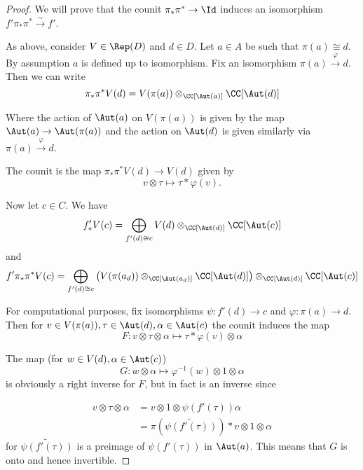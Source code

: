 \begin{proof}
We will prove that the counit $\pi_*\pi^*\rightarrow \Id$ induces an isomorphism $f'\pi_*\pi^*\xrightarrow{\sim}f'$.

As above, consider $V\in\Rep(D)$ and $d\in D$. Let $a\in A$ be such that $\pi(a)\cong d$. By assumption $a$ is defined up to isomorphism. Fix an isomorphism $\pi(a)\xrightarrow{\varphi} d$. Then we can write \[
\pi_*\pi^*V(d)=V(\pi(a))\otimes_{\CC[\Aut(a)]}\CC[\Aut(d)]
\]

Where the action of $\Aut(a)$ on $V(\pi(a))$ is given by the map $\Aut(a)\rightarrow \Aut(\pi(a))$ and the action on $\Aut(d)$ is given similarly via $\pi(a)\xrightarrow{\varphi} d$.

The counit is the map $\pi_*\pi^*V(d)\rightarrow V(d)$ given by \[
v\otimes \tau \mapsto \tau*\varphi(v).
\]

Now let $c\in C$. We have \[
f'_*V(c)=\bigoplus_{f'(d)\cong c} V(d) \otimes_{\CC[\Aut(d)]}\CC[\Aut(c)]
\]
and \[
f'\pi_*\pi^*V(c)=\bigoplus_{f'(d)\cong c} \left(V(\pi(a_d))\otimes_{\CC[\Aut(a_d)]}\CC[\Aut(d)]\right) \otimes_{\CC[\Aut(d)]}\CC[\Aut(c)]
\]

For computational purposes, fix isomorphisms $\psi:f'(d)\rightarrow c$ and $\varphi:\pi(a)\rightarrow d$. Then for $v\in V(\pi(a)),\tau\in\Aut(d),\alpha\in\Aut(c)$ the counit induces the map
\[
F:v\otimes \tau \otimes \alpha \mapsto \tau*\varphi(v)\otimes\alpha
\]

The map (for $w\in V(d),\alpha\in\Aut(c)$)
\[
G:w\otimes \alpha \mapsto \varphi^{-1}(w)\otimes 1 \otimes \alpha
\]
is obviously a right inverse for $F$, but in fact is an inverse since 


\begin{align*}
v\otimes\tau\otimes\alpha&=v\otimes 1 \otimes \psi(f'(\tau))\alpha\\
&=\pi(\widetilde{\psi(f'(\tau))})*v\otimes 1 \otimes \alpha
\end{align*}
for $\widetilde{\psi(f'(\tau))}$ is a preimage of $\psi(f'(\tau))$ in $\Aut(a)$. This means that $G$ is onto and hence invertible.
\end{proof}